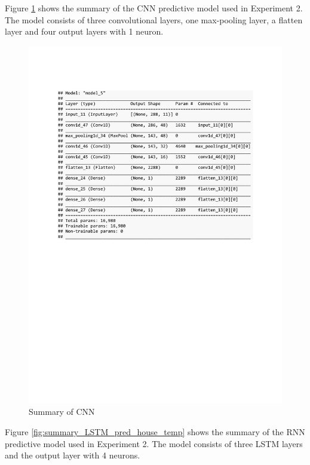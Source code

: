 Figure \ref{fig:summary_CNN_pred_house_temp} shows the summary of the CNN predictive model used in Experiment 2. The model consists of three convolutional layers, one max-pooling layer, a flatten layer and four output layers with 1 neuron.
\begin{figure}[h]
	\centering
	\includegraphics[scale=0.5]{Figures/summary_CNN_pred_house_temp}
	\decoRule
	\caption[Experiment 2: Summary of CNN for unsupervised learning]{Summary of CNN \parencite{own}}
	\label{fig:summary_CNN_pred_house_temp}
\end{figure}
\clearpage
Figure \ref{fig:summary_LSTM_pred_house_temp} shows the summary of the RNN predictive model used in Experiment 2. The model consists of three LSTM layers and the output layer with 4 neurons.

